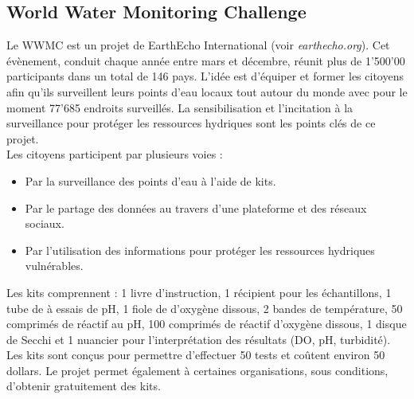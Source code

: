 \documentclass[10pt, article]{llncs}
\begin{document}
	\subsection{World Water Monitoring Challenge}
		Le WWMC est un projet de EarthEcho International (voir \textit{earthecho.org}). Cet évènement, conduit chaque année entre mars et décembre, réunit plus de 1'500'00 participants dans un total de 146 pays. L'idée est d'équiper et former les citoyens afin qu'ils surveillent leurs points d'eau locaux tout autour du monde avec pour le moment 77'685 endroits surveillés. La sensibilisation et l'incitation à la surveillance pour protéger les ressources hydriques sont les points clés de ce projet. \\
		Les citoyens participent par plusieurs voies :
		\begin{itemize}
			\item Par la surveillance des points d'eau à l'aide de kits.
			\item Par le partage des données au travers d'une plateforme et des réseaux sociaux.
			\item Par l'utilisation des informations pour protéger les ressources hydriques vulnérables. 
		\end{itemize}
		Les kits comprennent : 1 livre d'instruction, 1 récipient pour les échantillons, 1 tube de à essais de pH, 1 fiole de d'oxygène dissous, 2 bandes de température, 50 comprimés de réactif au pH, 100 comprimés de réactif d'oxygène dissous, 1 disque de Secchi et 1 nuancier pour l'interprétation des résultats (DO, pH, turbidité). Les kits sont conçus pour permettre d'effectuer 50 tests et coûtent environ 50 dollars. Le projet permet également à certaines organisations, sous conditions, d'obtenir gratuitement des kits.
	
\end{document}
